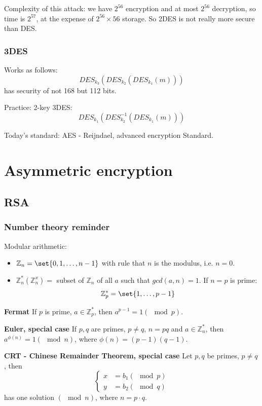 \documentclass[language=english,number=]{homework}
\begin{document}
    Complexity of this attack: we have $2^{56}$ encryption and at most $2^{56}$ decryption, so time is $2^{57}$, at the expense of $2^{56} \times 56$ storage.
    So 2DES is not really more secure than DES.

    \subsubsection{3DES}

    Works as follows:
    \[
        DES_{k_3}(DES_{k_2}(DES_{k_1}(m)))
    \]
    has security of not 168 but 112 bits.

    Practice: 2-key 3DES:
    \[
        DES_{k_1}(DES_{k_2}^{-1}(DES_{k_1}(m)))
    \]

    Today's standard: AES - Reijndael, advanced encryption Standard.

    \newpage
    \section{Asymmetric encryption}

    \subsection{RSA}

    \subsubsection{Number theory reminder}

    Modular arithmetic:
    \begin{itemize}
        \item $\mathbb{Z}_n = \set{0,1,\dots,n-1}$ with rule that $n$ is the modulus, i.e. $n=0$.
        \item $\mathbb{Z}_n^{*} (\mathbb{Z}_n^{x}) = $ subset of $\mathbb{Z}_n$ of all $a$ such that $gcd(a,n) = 1$.
        If $n = p$ is prime:
        \[
            \mathbb{Z}_p^{*} = \set{1,\dots,p-1}
        \]
    \end{itemize}

    \textbf{Fermat} If $p$ is prime, $a \in \mathbb{Z}_p^{*}$, then $a^{p-1} = 1 (\mod p)$.

    \textbf{Euler, special case} If $p,q$ are primes, $p \ne q$, $n = pq$ and $a \in \mathbb{Z}_n^{*}$, then $a^{\phi(n)} = 1 (\mod n)$, where $\phi(n) = (p-1)(q-1)$.

    \textbf{CRT - Chinese Remainder Theorem, special case} Let $p,q$ be primes, $p \ne q$, then
    \[
        \begin{cases}
            x &= b_1 (\mod p) \\
            y &= b_2 (\mod q)
        \end{cases}
    \]
    has one solution $(\mod n)$, where $n = p \cdot q$.
\end{document}
